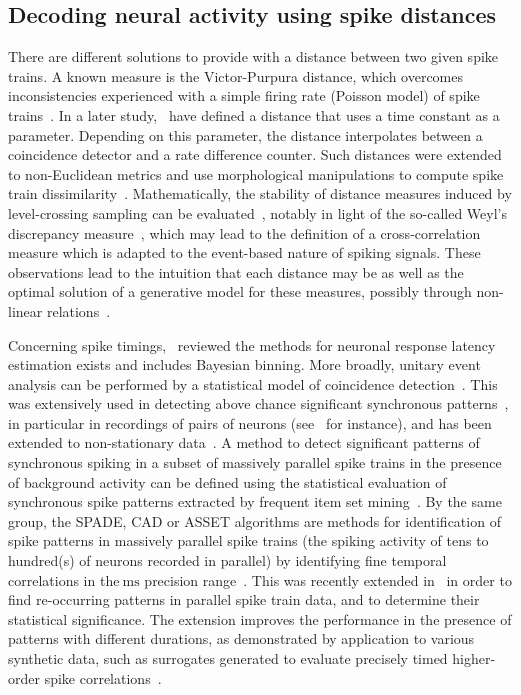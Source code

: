 \documentclass[brainsci, %
               review,submit,pdftex,moreauthors
               ]{Definitions/mdpi}
\newcommand{\ms}{\si{\milli\second}}%
\begin{document}
\subsection{Decoding neural activity using spike distances}
There are different solutions to provide with a distance between two given spike trains. A known measure is the Victor-Purpura distance, which  overcomes inconsistencies experienced with a simple firing rate (Poisson model) of spike trains~\citep{victor_nature_1996}. In a later study,~\citet{van_rossum_novel_2001} have defined a distance that uses a time constant as a parameter. Depending on this parameter, the distance interpolates between a coincidence detector and a rate difference counter. Such distances were extended to non-Euclidean metrics and use morphological manipulations to compute spike train dissimilarity~\citep{kreuz_measuring_2007}. Mathematically, the stability of distance measures induced by level-crossing sampling can be evaluated~\citep{moser_stability_2014}, notably in light of the so-called Weyl's discrepancy measure~\citep{weyl_ueber_1916}, which may lead to the definition of a cross-correlation measure which is adapted to the event-based nature of spiking signals. These observations lead to the intuition that each distance may be as well  as the optimal solution of a generative model for these measures, possibly through non-linear relations~\citep{aronov_non-euclidean_2004}. %

Concerning spike timings,~\citet{levakova_review_2015}  reviewed the methods for neuronal response latency estimation exists and includes Bayesian binning. More broadly, unitary event analysis can be performed by a statistical model of coincidence detection~\citep{grun_unitary_2002-1}. This was extensively used in detecting above chance significant synchronous patterns~\citep{grun_unitary_2010}, in particular in recordings of pairs of neurons (see~\citep{riehle_spike_1997} for instance), and has been extended to non-stationary data~\citep{grun_unitary_2002}. A method to detect significant patterns of synchronous spiking in a subset of massively parallel spike trains in the presence of background activity can be defined using the statistical evaluation of synchronous spike patterns extracted by frequent item set mining~\citep{torre_statistical_2013}. By the same group, the SPADE, CAD or ASSET algorithms are methods for identification of spike patterns in massively parallel spike trains (the spiking activity of tens to hundred(s) of neurons recorded in parallel) by identifying fine temporal correlations in the$~\ms$ precision range~\citep{quaglio_methods_2018}. This was recently extended in~\citep{stella_3d-spade_2019} in order to find re-occurring patterns in parallel spike train data, and to determine their statistical significance. The extension improves the performance in the presence of patterns with different durations, as demonstrated by application to various synthetic data, such as surrogates generated to evaluate precisely timed higher-order spike correlations~\citep{stella_comparing_2022}.
\end{document}

